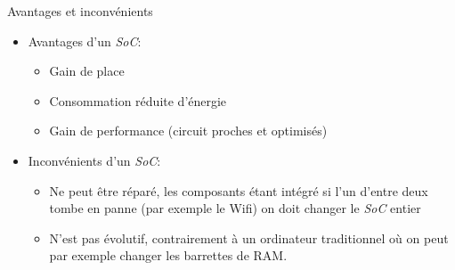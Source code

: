 \documentclass[10pt]{beamer}
\begin{document}
\begin{frame}{\SOC}
	\mframe{\SOC}
	\begin{block}{Avantages et inconvénients}
		\begin{itemize}[label=\textbullet]
			\item<1-> Avantages d'un \textit{SoC}:
			\begin{itemize}[label=\textbullet]
				\item<2-> Gain de place
				\item<3-> Consommation réduite d'énergie
				\item<4-> Gain de performance (circuit proches et optimisés)
			\end{itemize}
			\item<5-> Inconvénients d'un \textit{SoC}:
			\begin{itemize}[label=\textbullet]
				\item<2-> Ne peut être réparé, les composants étant intégré si l'un d'entre deux tombe en panne (par exemple le Wifi) on doit changer le \textit{SoC} entier
				\item<3-> N'est pas évolutif, contrairement à  un ordinateur traditionnel où on peut par exemple changer les barrettes de RAM.
			\end{itemize}
		\end{itemize}
	\end{block}
\end{frame}
\end{document}
